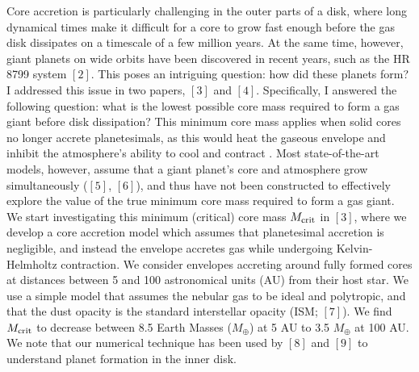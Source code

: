 \documentclass[12pt, letterpaper]{article}
\begin{document}
Core accretion is particularly challenging in the outer parts of a disk, where long dynamical times make it difficult for a core to grow fast enough before the gas disk dissipates on a timescale of a few million years. At the same time, however, giant planets on wide orbits have been discovered in recent years, such as the HR 8799 system $[2]$. This poses an intriguing question: how did these planets form? I addressed this issue in two papers, $[3]$ and $[4]$. Specifically, I answered the following question: what is the lowest possible core mass required to form a gas giant before disk dissipation? This minimum core mass applies when  solid cores no longer accrete planetesimals, as this would heat the gaseous envelope and inhibit the atmosphere's ability to cool and contract . Most state-of-the-art models, however, assume that a giant planet's core and atmosphere grow simultaneously ($[5]$, $[6]$), and thus have not been constructed to effectively explore the value of the true minimum core mass required to form a gas giant. We start investigating this minimum (critical) core mass $M_{\rm crit}$ in $[3]$, where we develop a core accretion model which assumes that planetesimal accretion is negligible, and instead the envelope accretes gas while undergoing Kelvin-Helmholtz contraction. 
We consider envelopes accreting around fully formed cores at distances between 5 and 100 astronomical units (AU) from their host star. We use a simple model that assumes the nebular gas to be ideal and polytropic, and that the dust opacity is the standard interstellar opacity (ISM; $[7]$). We find $M_{\rm crit}$ to decrease between 8.5 Earth Masses ($M_{\oplus}$) at 5 AU to 3.5 $M_{\oplus}$ at 100 AU. 
We note that our numerical technique has been used by $[8]$ and $[9]$ to understand planet formation in the inner disk. 
\end{document}
